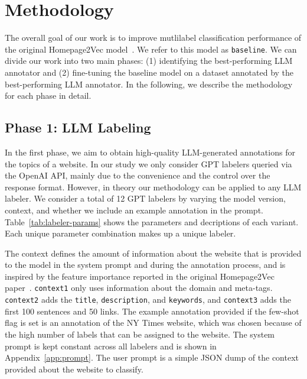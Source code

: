 \section{Methodology}\label{sec:methodology}

The overall goal of our work is to improve mutlilabel classification performance of the original Homepage2Vec model~\cite{homepage2vec}. We refer to this model as \texttt{baseline}. We can divide our work into two main phases: (1) identifying the best-performing LLM annotator and (2) fine-tuning the baseline model on a dataset annotated by the best-performing LLM annotator. In the following, we describe the methodology for each phase in detail.

\subsection*{Phase 1: LLM Labeling}



In the first phase, we aim to obtain high-quality LLM-generated annotations for the topics of a website. 
In our study we only consider GPT labelers queried via the OpenAI API, mainly due to the convenience and the control over the response format. However, in theory our methodology can be applied to any LLM labeler. We consider a total of 12 GPT labelers by varying the model version, context, and whether we include an example annotation in the prompt. Table~\ref{tab:labeler-params} shows the parameters and decriptions of each variant. Each unique parameter combination makes up a unique labeler.

The context defines the amount of information about the website that is provided to the model in the system prompt and during the annotation process, and is inspired by the feature importance reported in the original Homepage2Vec paper~\cite{homepage2vec}. \texttt{context1} only uses information about the domain and meta-tags. \texttt{context2} adds the \texttt{title}, \texttt{description}, and \texttt{keywords}, and \texttt{context3} adds the first 100 sentences and 50 links. The example annotation provided if the few-shot flag is set is an annotation of the NY Times website, which was chosen because of the high number of labels that can be assigned to the website. The system prompt is kept constant across all labelers and is shown in Appendix~\ref{app:prompt}. The user prompt is a simple JSON dump of the context provided about the website to classify.

